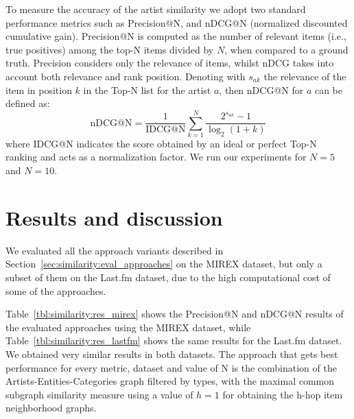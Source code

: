 To measure the accuracy of the artist similarity we adopt two standard performance metrics such as Precision@N, and nDCG@N (normalized discounted cumulative gain).
Precision@N is computed as the number of relevant items (i.e., true positives) among the top-N items divided by $N$, when compared to a ground truth.
Precision considers only the relevance of items, whilst nDCG takes into account both relevance and rank position. Denoting with  $s_{ak}$ the relevance of the item in position $k$ in the Top-N list for the artist $a$, then nDCG@N for $a$ can be defined as:
\begin{equation}\label{eq:recall}
\text{nDCG@N} = \frac{1 }{\text{IDCG@N}} \sum^N_{k=1} \frac{ 2^{ s_{ak}} -1 }{\log_2 (1+k)}
\end{equation}
where IDCG@N indicates the score obtained by an ideal or perfect Top-N ranking and acts as a normalization factor. We run our experiments for $N=5$ and $N=10$.

\section{Results and discussion} %
\label{sec:similarity:results}
We evaluated all the approach variants described in Section~\ref{sec:similarity:eval_approaches} on the MIREX dataset, but only a subset of them on the Last.fm dataset, due to the high computational cost of some of the approaches.

Table~\ref{tbl:similarity:res_mirex} shows the Precision@N and nDCG@N results of the evaluated approaches using the MIREX dataset, while Table~\ref{tbl:similarity:res_lastfm} shows the same results for the Last.fm dataset. We obtained very similar results in both datasets. The approach that gets best performance for every metric, dataset and value of N is the combination of the Artists-Entities-Categories graph filtered by types, with the maximal common subgraph similarity measure using a value of $h=1$ for obtaining the h-hop item neighborhood graphs.

